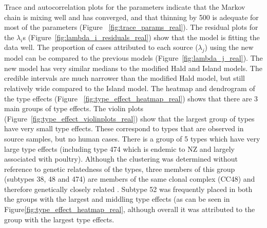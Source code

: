 \begin{knitrout}
\begin{kframe}
\begin{alltt}
 \hlkwb{<-} \hlstd{(}  \hlopt{~}  \hlopt{+}  \hlopt{+}  \hlopt{+}
                  \hlopt{+}  \hlopt{+} 
                \hlstd{=} \hlopt{~}      \hlstd{=} \hlstd{,}
                  \hlstd{=} \hlstd{,}  \hlstd{=} \hlstd{,}
                \hlstd{=} \hlstd{(} \hlstd{=} \hlstd{,}  \hlstd{=} \hlstd{))}
\end{alltt}
\end{kframe}
\end{knitrout}



Trace and autocorrelation plots for the parameters indicate that the Markov chain is mixing well and has converged, and that thinning by 500 is adequate for most of the parameters (Figure~
\ref{fig:trace_params_real}). The residual plots for the $\lambda_{i}$s (Figure~\ref{fig:lambda_i_residuals_real}) show that the model is fitting the data well. The proportion of cases attributed to each source ($\lambda_j$) using the new model can be compared to the previous models (Figure~\ref{fig:lambda_j_real}). The new 
model has very similar medians to the modified Hald and Island models. The credible intervals are much narrower than the modified Hald model, but still relatively wide compared to the Island model.
The heatmap and dendrogram of the type effects (Figure~
\ref{fig:type_effect_heatmap_real}) shows that there are 3 main groups of type effects. The violin plots (Figure~\ref{fig:type_effect_violinplots_real}) show that the largest group of types have very small type effects. These correspond to types that are observed in source samples, but no human cases. There is a group of 5 types which have very large type effects (including type 474 which is endemic to NZ and largely associated 
with poultry). Although the clustering was determined without reference to genetic relatedness of the types, three members of this group (subtypes 38, 48 and 474) are members of the same clonal complex (CC48) and therefore genetically closely related \citep{pubmlstCampy}. Subtype 52 was frequently placed in both the groups with the largest and middling type effects (as can be seen in Figure\ref{fig:type_effect_heatmap_real}, although overall it was attributed to the group with the largest type effects.

